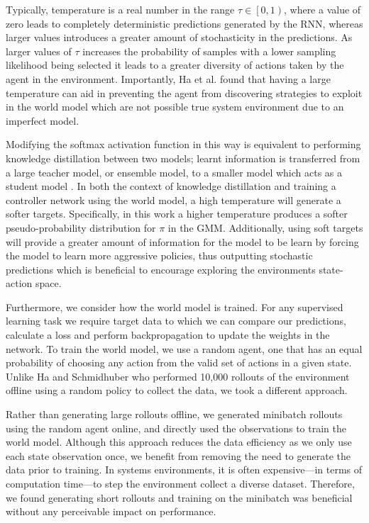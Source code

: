Typically, temperature is a real number in the range $\tau \in \left[ 0, 1 \right)$, where a value of zero leads to completely deterministic predictions generated by the RNN, whereas larger values introduces a greater amount of stochasticity in the predictions. As larger values of $\tau$ increases the probability of samples with a lower sampling likelihood being selected it leads to a greater diversity of actions taken by the agent in the environment. Importantly, Ha et al. \cite{ha2018worldmodels} found that having a large temperature can aid in preventing the agent from discovering strategies to exploit in the world model which are not possible true system environment due to an imperfect model.

Modifying the softmax activation function in this way is equivalent to performing knowledge distillation between two models; learnt information is transferred from a large teacher model, or ensemble model, to a smaller model which acts as a student model \cite{hinton2015distilling}. In both the context of knowledge distillation and training a controller network using the world model, a high temperature will generate a softer targets. Specifically, in this work a higher temperature produces a softer pseudo-probability distribution for $\pi$ in the GMM. Additionally, using soft targets will provide a greater amount of information for the model to be learn by forcing the model to learn more aggressive policies, thus outputting stochastic predictions which is beneficial to encourage exploring the environments state-action space.

Furthermore, we consider how the world model is trained. For any supervised learning task we require target data to which we can compare our predictions, calculate a loss and perform backpropagation to update the weights in the network. To train the world model, we use a random agent, one that has an equal probability of choosing any action from the valid set of actions in a given state. Unlike Ha and Schmidhuber \cite{ha2018worldmodels} who performed 10,000 rollouts of the environment offline using a random policy to collect the data, we took a different approach.

Rather than generating large rollouts offline, we generated minibatch rollouts using the random agent online, and directly used the observations to train the world model. Although this approach reduces the data efficiency as we only use each state observation once, we benefit from removing the need to generate the data prior to training. In systems environments, it is often expensive---in terms of computation time---to step the environment collect a diverse dataset. Therefore, we found generating short rollouts and training on the minibatch was beneficial without any perceivable impact on performance.

